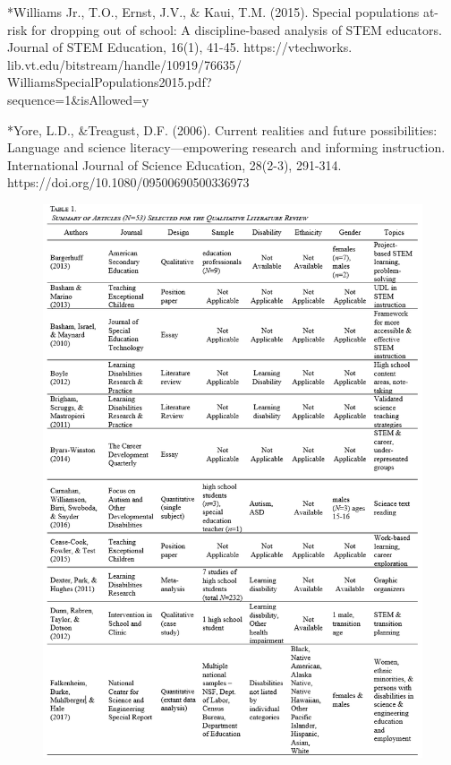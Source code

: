 \documentclass[11pt]{sig-alternate}
\begin{document}
\begin{large}
*Williams Jr., T.O., Ernst, J.V., \& Kaui, T.M. (2015). Special populations at-risk for dropping out of school: A discipline-based analysis of STEM educators. Journal of STEM Education, 16(1), 41-45. https://vtechworks.\\lib.vt.edu/bitstream/handle/10919/76635/ \\WilliamsSpecialPopulations2015.pdf?\\sequence=1\&isAllowed=y

*Yore, L.D., \&Treagust, D.F. (2006). Current realities and future possibilities: Language and science literacy—empowering research and informing instruction. International Journal of Science Education, 28(2-3), 291-314. https://doi.org/10.1080/09500690500336973
\pagebreak

 


\endleftskipleftskip 
\endparindentparindentparindentparindent

\newpage
\pagebreak

\clearpage



\begin{figure}[htp]

    \includegraphics[width=14cm]{Table1a.png}
\end{figure}
\newpage
\pagebreak
\clearpage
\begin{figure}[htp]


\end{figure}
\end{large}
\end{document}
